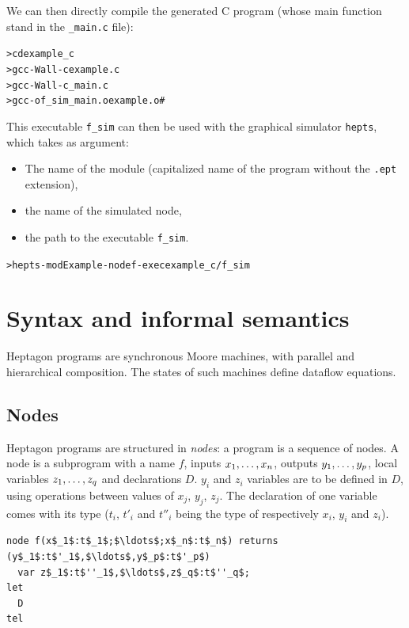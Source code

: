 \documentclass[a4paper]{article}
\begin{document}
We can then directly compile the generated C program (whose main function stand
in the \texttt{\_main.c} file):
\begin{alltt}
> cd example_c
> gcc -Wall -c example.c
> gcc -Wall -c _main.c
> gcc -o f_sim _main.o example.o       # 
\end{alltt}

This executable \texttt{f\_sim} can then be used with the graphical simulator
\texttt{hepts}, which takes as argument:
\begin{itemize}
\item The name of the module (capitalized name of the program without the
  \texttt{.ept} extension),
\item the name of the simulated node,
\item the path to the executable \texttt{f\_sim}.
\end{itemize}
\begin{alltt}
> hepts -mod Example -node f -exec example_c/f_sim
\end{alltt}

\section{Syntax and informal semantics}
\label{sec:synt-infor-sem}

Heptagon programs are synchronous Moore machines, with parallel and hierarchical
composition. The states of such machines define dataflow equations. 

\subsection{Nodes}
\label{sec:nodes}

Heptagon programs are structured in \emph{nodes}: a program is a sequence of
nodes. A node is a subprogram with a name $f$, inputs $\ton{x}{,}$, outputs
$\ton[1][p]{y}{,}$, local variables $\ton[1][q]{z}{,}$ and declarations
$D$. $y_i$ and $z_i$ variables are to be defined in $D$, using operations
between values of $x_j$, $y_j$, $z_j$. The declaration of one variable comes with its type
($t_i$, $t'_i$ and $t''_i$ being the type of respectively $x_i$, $y_i$ and
$z_i$).

\begin{lstlisting}
node f(x$_1$:t$_1$;$\ldots$;x$_n$:t$_n$) returns (y$_1$:t$'_1$,$\ldots$,y$_p$:t$'_p$)
  var z$_1$:t$''_1$,$\ldots$,z$_q$:t$''_q$;
let
  D
tel
\end{lstlisting}
\end{document}
